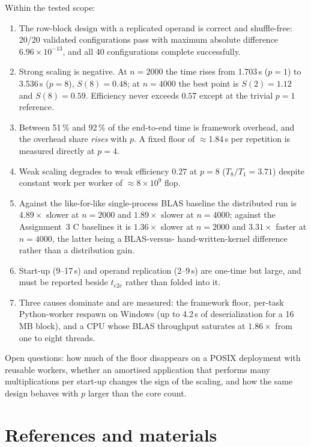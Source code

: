 \documentclass[11pt,a4paper]{article}
\begin{document}
Within the tested scope:
\begin{enumerate}
  \item The row-block design with a replicated operand is correct and
        shuffle-free: 20/20 validated configurations pass with maximum
        absolute difference $6.96\times10^{-13}$, and all 40
        configurations complete successfully.
  \item Strong scaling is negative. At $n=2000$ the time rises from
        1.703\,s ($p=1$) to 3.536\,s ($p=8$), $S(8)=0.48$; at $n=4000$
        the best point is $S(2)=1.12$ and $S(8)=0.59$. Efficiency never
        exceeds $0.57$ except at the trivial $p=1$ reference.
  \item Between 51\,\% and 92\,\% of the end-to-end time is framework
        overhead, and the overhead share \emph{rises} with $p$. A fixed
        floor of $\approx$1.84\,s per repetition is measured directly at
        $p=4$.
  \item Weak scaling degrades to weak efficiency $0.27$ at $p=8$
        ($T_8/T_1 = 3.71$) despite constant work per worker of
        $\approx 8\times10^9$ flop.
  \item Against the like-for-like single-process BLAS baseline the
        distributed run is $4.89\times$ slower at $n=2000$ and
        $1.89\times$ slower at $n=4000$; against the Assignment~3 C
        baselines it is $1.36\times$ slower at $n=2000$ and
        $3.31\times$ faster at $n=4000$, the latter being a BLAS-versus-
        hand-written-kernel difference rather than a distribution gain.
  \item Start-up (9--17\,s) and operand replication (2--9\,s) are
        one-time but large, and must be reported beside $t_{e2e}$ rather
        than folded into it.
  \item Three causes dominate and are measured: the framework floor,
        per-task Python-worker respawn on Windows (up to 4.2\,s of
        deserialization for a 16\,MB block), and a CPU whose BLAS
        throughput saturates at $1.86\times$ from one to eight threads.
\end{enumerate}

Open questions: how much of the floor disappears on a POSIX deployment
with reusable workers, whether an amortised application that performs
many multiplications per start-up changes the sign of the scaling, and
how the same design behaves with $p$ larger than the core count.

\section{References and materials}
\end{document}
